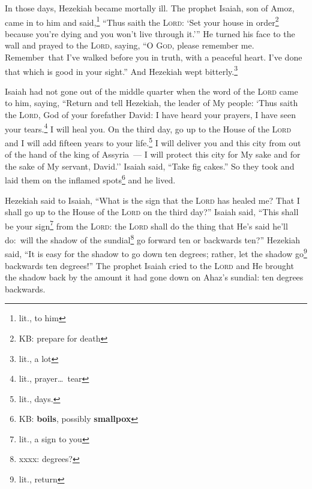 
\begin{inparaenum}
     In those days, Hezekiah became mortally ill. The prophet Isaiah, son of Amoz, came in to him and said,\footnote{lit., to him} ``Thus saith the \textsc{Lord}: `Set your house in order\footnote{KB: prepare for death} because you're dying and you won't live through it.'\thinspace''%
     He turned his face to the wall and prayed to the \textsc{Lord}, saying,%
     ``O \textsc{God}, please remember me. Remember\understood\ that I've walked before you in truth, with a peaceful heart. I've done that which is good in your sight.'' And Hezekiah wept bitterly.\footnote{lit., a lot}%
    
     Isaiah had not gone out of the middle quarter when the word of the \textsc{Lord} came to him, saying,%
     ``Return and tell Hezekiah, the leader of My people: `Thus saith the \textsc{Lord}, God of your forefather David: I have heard your prayers, I have seen your tears.\footnote{lit., prayer\dots\ tear} I will heal you. On the third day, go up to the House of the \textsc{Lord}%
     and I will add fifteen years to your life.\footnote{lit., days.} I will deliver you and this city from out of the hand of the king of Assyria~--- I will protect this city for My sake and for the sake of My servant, David.''%
     Isaiah said, ``Take fig cakes.'' So they took and laid them on the inflamed spots\footnote{KB: \textbf{boils}, possibly \textbf{smallpox}} and he lived.%
    
     Hezekiah said to Isaiah, ``What is the sign that the \textsc{Lord} has healed me? That I shall go up to the House of the \textsc{Lord} on the third day?''%
     Isaiah said, ``This shall be your sign\footnote{lit., a sign to you} from the \textsc{Lord}: the \textsc{Lord} shall do the thing that He's said he'll do:\understood\ will the shadow of the sundial\footnote{xxxx: degrees?} go forward ten or backwards ten?''%
     Hezekiah said, ``It is easy for the shadow to go down ten degrees; rather, let the shadow go\footnote{lit., return} backwards ten degrees!''%
     The prophet Isaiah cried to the \textsc{Lord} and He brought the shadow back by the amount it had gone down on Ahaz's sundial: ten degrees backwards.%
    

\end{inparaenum}
